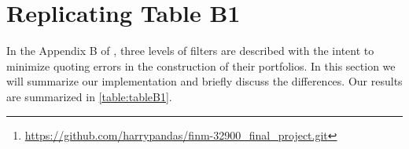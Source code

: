 \begin{titlepage}

% 
\maketitle


\doublespacing
\begin{abstract}
In this article we will summarize our efforts to replicate the filtering described in Appendix B of \textit{The Puzzle of Index Option Returns} by \citet{constantinides2013}. We provide additional insight on how these filters shape the resultant distributions of implied volatility vs moneyness for a large cross-section of SPX calls and puts over two timeframes. Due to the unavailability of index option data from 1985 to 1995, we focus our comparison on the dataset of \STARTONE\  to \ENDONE\ as well as extending this analysis forward from \STARTTWO\  to \ENDTWO. Through a sequence of data visualizations, we show that while intricately constructed data filters may yield elegant results in one time period, these results do not necessarily port over to other time periods. Our analysis can be readily found on our \href{https://github.com/harrypandas/finm-32900_final_project.git}{Github} \footnote{ \url{https://github.com/harrypandas/finm-32900_final_project.git} }.  


\end{abstract}


\end{titlepage}

\doublespacing


\section{Replicating Table B1}

In the Appendix B of \citet{constantinides2013}, three levels of filters are described with the intent to minimize quoting errors in the construction of their portfolios. In this section we will summarize our implementation and briefly discuss the differences. Our results are summarized in \autoref{table:tableB1}. 
